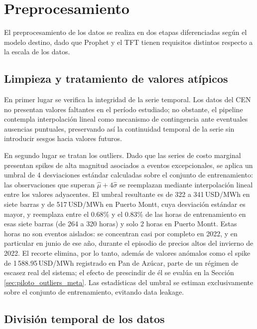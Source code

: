 \section{Preprocesamiento}

El preprocesamiento de los datos se realiza en dos etapas diferenciadas según el modelo destino, dado que Prophet y el TFT tienen requisitos distintos respecto a la escala de los datos.

\subsection{Limpieza y tratamiento de valores atípicos}
\label{sec:limpieza_outliers}

En primer lugar se verifica la integridad de la serie temporal. Los datos del CEN no presentan valores faltantes en el período estudiado; no obstante, el pipeline contempla interpolación lineal como mecanismo de contingencia ante eventuales ausencias puntuales, preservando así la continuidad temporal de la serie sin introducir sesgos hacia valores futuros.

En segundo lugar se tratan los outliers. Dado que las series de costo marginal presentan spikes de alta magnitud asociados a eventos excepcionales, se aplica un umbral de 4 desviaciones estándar calculadas sobre el conjunto de entrenamiento: las observaciones que superan $\hat{\mu} + 4\hat{\sigma}$ se reemplazan mediante interpolación lineal entre los valores adyacentes. El umbral resultante es de 322 a 341\,USD/MWh en siete barras y de 517\,USD/MWh en Puerto Montt, cuya desviación estándar es mayor, y reemplaza entre el 0.68\% y el 0.83\% de las horas de entrenamiento en esas siete barras (de 264 a 320 horas) y solo 2 horas en Puerto Montt. Estas horas no son eventos aislados: se concentran casi por completo en 2022, y en particular en junio de ese año, durante el episodio de precios altos del invierno de 2022. El recorte elimina, por lo tanto, además de valores anómalos como el spike de 1\,588.95\,USD/MWh registrado en Pan de Azúcar, parte de un régimen de escasez real del sistema; el efecto de prescindir de él se evalúa en la Sección \ref{sec:piloto_outliers_meta}. Las estadísticas del umbral se estiman exclusivamente sobre el conjunto de entrenamiento, evitando data leakage.

\subsection{División temporal de los datos}

